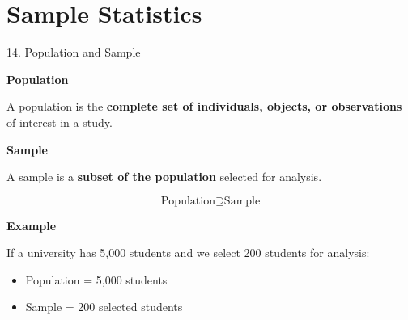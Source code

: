
\section{Sample Statistics}


\begin{frame}{14. Population and Sample}

\textbf{Population}

A population is the \textbf{complete set of individuals,
objects, or observations} of interest in a study.

\vspace{0.4cm}

\textbf{Sample}

A sample is a \textbf{subset of the population} selected for
analysis.

\vspace{0.4cm}

\[
\boxed{
\text{Population}
\supseteq
\text{Sample}
}
\]

\vspace{0.3cm}

\textbf{Example}

If a university has 5,000 students and we select 200 students
for analysis:

\begin{itemize}
    \item Population = 5,000 students
    \item Sample = 200 selected students
\end{itemize}

\end{frame}


